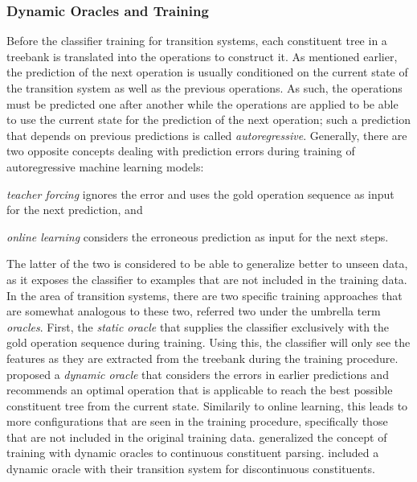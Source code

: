 \documentclass[../document.tex]{subfiles}
\begin{document}
    \subsubsection*{Dynamic Oracles and Training}
    Before the classifier training for transition systems, each constituent tree in a treebank is translated into the operations to construct it.
    As mentioned earlier, the prediction of the next operation is usually conditioned on the current state of the transition system as well as the previous operations.
    As such, the operations must be predicted one after another while the operations are applied to be able to use the current state for the prediction of the next operation; such a prediction that depends on previous predictions is called \emph{autoregressive}.
    Generally, there are two opposite concepts dealing with prediction errors during training of autoregressive machine learning models:
    \begin{compactitem}
        \item \emph{teacher forcing} ignores the error and uses the gold operation sequence as input for the next prediction, and
        \item \emph{online learning} considers the erroneous prediction as input for the next steps.
    \end{compactitem}
    The latter of the two is considered to be able to generalize better to unseen data, as it exposes the classifier to examples that are not included in the training data.
    In the area of transition systems, there are two specific training approaches that are somewhat analogous to these two, referred two under the umbrella term \emph{oracles}.
    First, the \emph{static oracle} that supplies the classifier exclusively with the gold operation sequence during training.
    Using this, the classifier will only see the features as they are extracted from the treebank during the training procedure.
    \cite{Goldberg12} proposed a \emph{dynamic oracle} that considers the errors in earlier predictions and recommends an optimal operation that is applicable to reach the best possible constituent tree from the current state.
    Similarily to online learning, this leads to more configurations that are seen in the training procedure, specifically those that are not included in the original training data.
    \citet{Coavoux16,Cross16} generalized the concept of training with dynamic oracles to continuous constituent parsing.
    \citet{CoaCoh19} included a dynamic oracle with their transition system for discontinuous constituents.
    
\end{document}
